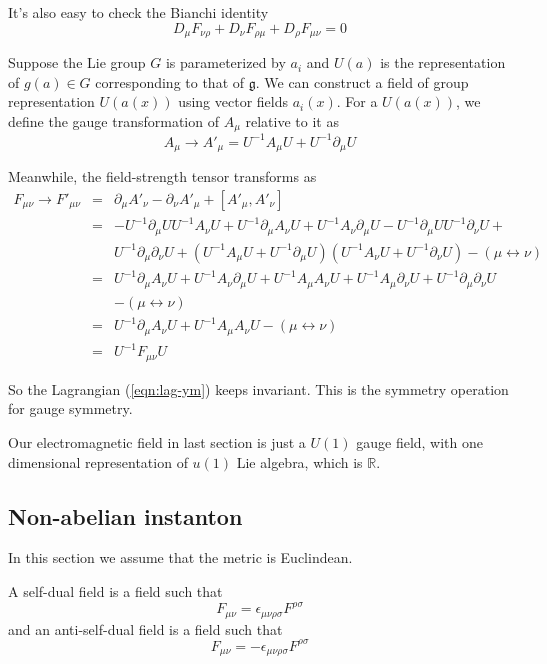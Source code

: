 \documentclass[12pt]{book}
\begin{document}
	It's also easy to check the Bianchi identity
	\begin{equation}
		D_\mu F_{\nu\rho}+D_\nu F_{\rho\mu}+D_\rho F_{\mu\nu}=0
	\end{equation}
	
	Suppose the Lie group $G$ is parameterized by $a_i$ and $U(a)$ is the representation of $g(a)\in G$ corresponding to that of $\mathfrak g$. We can construct a field of group representation $U(a(x))$ using vector fields $a_i(x)$. For a $U(a(x))$, we define the gauge transformation of $A_\mu$ relative to it as 
	\begin{equation}
		A_\mu\longrightarrow A'_\mu=U^{-1}A_\mu U+U^{-1}\partial_\mu U
	\end{equation}
	
	Meanwhile, the field-strength tensor transforms as 
	\begin{eqnarray}
		F_{\mu\nu}\longrightarrow F'_{\mu\nu}&=&\partial_\mu A'_\nu-\partial_\nu A'_\mu+[A'_\mu,A'_\nu]\\
		&=&-U^{-1}\partial_\mu UU^{-1}A_\nu U+ U^{-1}\partial_\mu A_\nu U+U^{-1}A_\nu\partial_\mu U-U^{-1}\partial_\mu UU^{-1}\partial_\nu U+ \nonumber\\
		&&U^{-1}\partial_\mu\partial_\nu U+(U^{-1}A_\mu U+U^{-1}\partial_\mu U)(U^{-1}A_\nu U+U^{-1}\partial_\nu U)-(\mu\leftrightarrow\nu)\\
		&=& U^{-1}\partial_\mu A_\nu U+U^{-1}A_\nu\partial_\mu U+U^{-1}A_\mu A_\nu U+U^{-1}A_\mu\partial_\nu U+U^{-1}\partial_\mu\partial_\nu U \nonumber\\
		&&-(\mu\leftrightarrow\nu)\\
		&=& U^{-1}\partial_\mu A_\nu U+U^{-1}A_\mu A_\nu U-(\mu\leftrightarrow\nu)\\
		&=& U^{-1}F_{\mu\nu} U
	\end{eqnarray}
	
	So the Lagrangian (\ref{eqn:lag-ym}) keeps invariant. This is the symmetry operation for gauge symmetry. 
	
	Our electromagnetic field in last section is just a $U(1)$ gauge field, with one dimensional representation of $u(1)$ Lie algebra, which is $\mathbb R$.
	\subsection{Non-abelian instanton}
	In this section we assume that the metric is Euclindean.
	
	A self-dual field is a field such that
	\begin{equation}
		F_{\mu\nu}=\epsilon_{\mu\nu\rho\sigma}F^{\rho\sigma}
	\end{equation}
	and an anti-self-dual field is a field such that
	\begin{equation}
		F_{\mu\nu}=-\epsilon_{\mu\nu\rho\sigma}F^{\rho\sigma}
	\end{equation}
	
\end{document}
